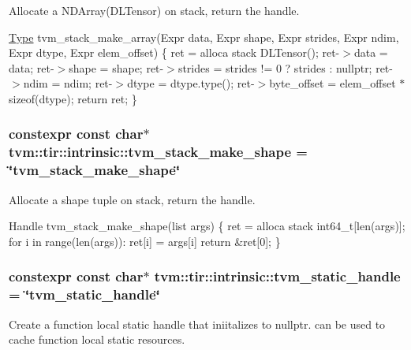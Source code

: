 Allocate a N\+D\+Array(\+D\+L\+Tensor) on stack, return the handle. 

\hyperlink{classtvm_1_1Type}{Type} tvm\+\_\+stack\+\_\+make\+\_\+array(Expr data, Expr shape, Expr strides, Expr ndim, Expr dtype, Expr elem\+\_\+offset) \{ ret = alloca stack D\+L\+Tensor(); ret-\/$>$data = data; ret-\/$>$shape = shape; ret-\/$>$strides = strides != 0 ? strides \+: nullptr; ret-\/$>$ndim = ndim; ret-\/$>$dtype = dtype.\+type(); ret-\/$>$byte\+\_\+offset = elem\+\_\+offset $\ast$ sizeof(dtype); return ret; \} 
\subsubsection[{\texorpdfstring{tvm\+\_\+stack\+\_\+make\+\_\+shape}{tvm_stack_make_shape}}]{\setlength{\rightskip}{0pt plus 5cm}constexpr const char$\ast$ tvm\+::tir\+::intrinsic\+::tvm\+\_\+stack\+\_\+make\+\_\+shape = \char`\"{}tvm\+\_\+stack\+\_\+make\+\_\+shape\char`\"{}}\hypertarget{namespacetvm_1_1tir_1_1intrinsic_aab2d9941d781b4b5bb399cffb9488fd6}{}\label{namespacetvm_1_1tir_1_1intrinsic_aab2d9941d781b4b5bb399cffb9488fd6}


Allocate a shape tuple on stack, return the handle. 

Handle tvm\+\_\+stack\+\_\+make\+\_\+shape(list args) \{ ret = alloca stack int64\+\_\+t\mbox{[}len(args)\mbox{]}; for i in range(len(args))\+: ret\mbox{[}i\mbox{]} = args\mbox{[}i\mbox{]} return \&ret\mbox{[}0\mbox{]}; \} 
\subsubsection[{\texorpdfstring{tvm\+\_\+static\+\_\+handle}{tvm_static_handle}}]{\setlength{\rightskip}{0pt plus 5cm}constexpr const char$\ast$ tvm\+::tir\+::intrinsic\+::tvm\+\_\+static\+\_\+handle = \char`\"{}tvm\+\_\+static\+\_\+handle\char`\"{}}\hypertarget{namespacetvm_1_1tir_1_1intrinsic_a075f340d77d7e0b8b60616fe5e64d2cc}{}\label{namespacetvm_1_1tir_1_1intrinsic_a075f340d77d7e0b8b60616fe5e64d2cc}


Create a function local static handle that iniitalizes to nullptr. can be used to cache function local static resources. 

